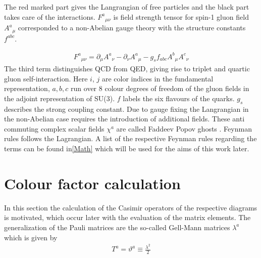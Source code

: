 The red marked part gives the Langrangian of free particles and the black part takes care of the interactions. ${F^a}_{\mu \nu}$ is field strength tensor for spin-1 gluon field $ {A^a}_{\mu} $ corresponded to a non-Abelian gauge theory with the structure constants $ f^{abc} $.

\begin{equation}
\begin{split}
{F^a}_{\mu \nu}= \partial_\mu {A^a}_{\nu}-\partial_\nu {A^a}_{\mu}-g_s f_{abc} {A^b}_{\mu} {A^c}_{\nu}
\end{split}
\end{equation}
The third term distinguishes QCD from QED, giving rise to triplet and quartic gluon self-interaction.
Here $i$, $j$ are color indices in the fundamental representation, $a, b , c$ run over 8 colour degrees of freedom of the gluon fields in the adjoint representation of SU(3). $f$ labels the six flavours of the quarks. $ g_s $ describes the strong coupling constant. Due to gauge fixing the Langrangian in the non-Abelian case requires the introduction of additional fields. These anti commuting complex scalar fields $ {\chi^a} $ are called Faddeev Popov ghosts \cite{Schwartz:2013pla, peskin2018introduction}. Feynman rules follows the Lagrangian. A list of the respective Feynman rules regarding the terms can be found in\ref{Math}  which will be used for the aims of this work later.

%

\label{Feynman}

\pagebreak

\section{Colour factor calculation}
\label{col}
In this section the calculation of the Casimir operators of the respective diagrams is motivated, which occur later with the evaluation of the matrix elements. The generalization of the Pauli matrices are the so-called Gell-Mann matrices $\lambda ^a$ which is given by \cite{Schwartz:2013pla, Platzer:2018pmd}
\begin{equation}
\begin{split}
T^a = \vartheta^a \equiv \frac{\lambda ^2}{2}
\end{split}
\end{equation}

